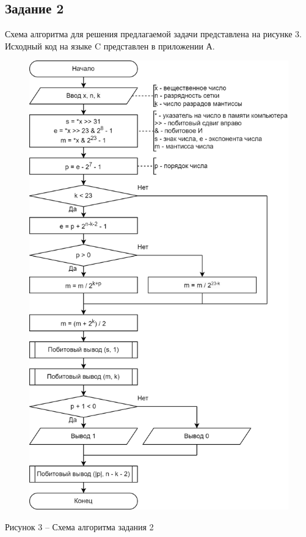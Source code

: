 \documentclass[a4paper,14pt]{extarticle}
\begin{document}
  \subsection*{Задание 2}
  Схема алгоритма для решения предлагаемой задачи представлена на рисунке 3. Исходный код на языке C представлен в приложении А.
  \begin{figure}[h]
    \centering
    \includegraphics[width=0.65\linewidth]{schemes/s-2}
  \end{figure}
  \begin{center}
    Рисунок 3 – Схема алгоритма задания 2
  \end{center}

  \pagebreak
\end{document}

